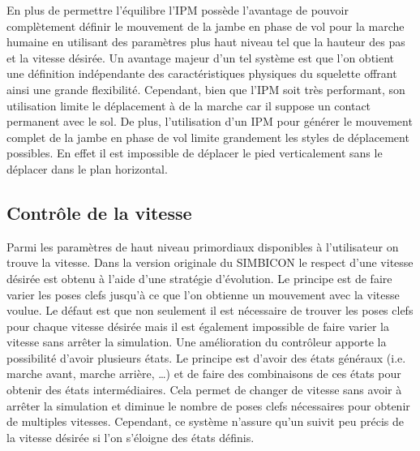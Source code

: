 \documentclass[runningheads,a4paper]{llncs}
\begin{document}
En plus de permettre l'équilibre l'IPM possède l'avantage de pouvoir complètement définir le mouvement de la jambe en phase de vol pour la marche humaine en utilisant des paramètres plus haut niveau tel que la hauteur des pas et la vitesse désirée. Un avantage majeur d'un tel système est que l'on obtient une définition indépendante des caractéristiques physiques du squelette offrant ainsi une grande flexibilité. Cependant, bien que l'IPM soit très performant, son utilisation limite le déplacement à de la marche car il suppose un contact permanent avec le sol. De plus, l'utilisation d'un IPM pour générer le mouvement complet de la jambe en phase de vol limite grandement les styles de déplacement possibles. En effet il est impossible de déplacer le pied verticalement sans le déplacer dans le plan horizontal.

\subsection{Contrôle de la vitesse}
Parmi les paramètres de haut niveau primordiaux disponibles à l'utilisateur on trouve la vitesse. Dans la version originale du SIMBICON le respect d'une vitesse désirée est obtenu à l'aide d'une stratégie d'évolution. Le principe est de faire varier les poses clefs jusqu'à ce que l'on obtienne un mouvement avec la vitesse voulue. Le défaut est que non seulement il est nécessaire de trouver les poses clefs pour chaque vitesse désirée mais il est également impossible de faire varier la vitesse sans arrêter la simulation. Une amélioration du contrôleur \cite{coros2009robust} apporte la possibilité d'avoir plusieurs états. Le principe est d'avoir des états généraux (i.e. marche avant, marche arrière, …) et de faire des combinaisons de ces états pour obtenir des états intermédiaires. Cela permet de changer de vitesse sans avoir à arrêter la simulation et diminue le nombre de poses clefs nécessaires pour obtenir de multiples vitesses. Cependant, ce système n'assure qu'un suivit peu précis de la vitesse désirée si l'on s'éloigne des états définis.
\end{document}

